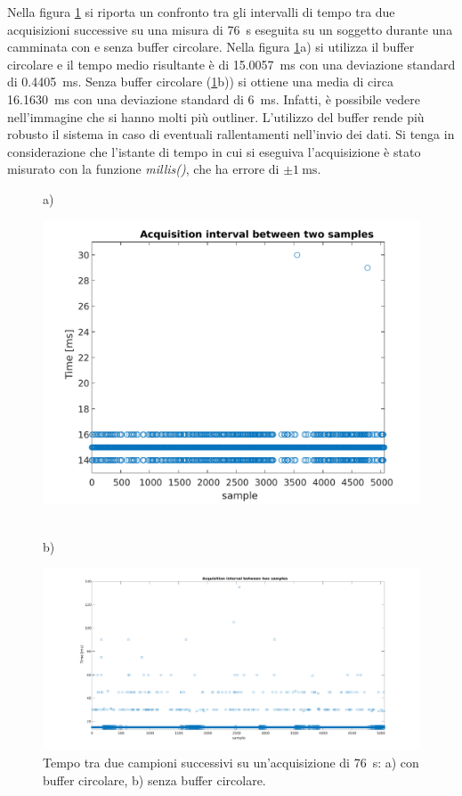 Nella figura \ref{fig:time_interval} si riporta un confronto tra gli intervalli di tempo tra due acquisizioni successive su una misura di \SI{76}{\second} eseguita su un soggetto durante una camminata con e senza buffer circolare. Nella figura \ref{fig:time_interval}a) si utilizza il buffer circolare e il tempo medio risultante è di \SI{15.0057}{\milli\second} con una deviazione standard di \SI{0.4405}{\milli\second}. Senza buffer circolare (\Fig\ref{fig:time_interval}b)) si ottiene una media di circa \SI{16.1630}{\milli\second} con una deviazione standard di \SI{6}{\milli\second}. Infatti, è possibile vedere nell'immagine che si hanno molti più outliner. L'utilizzo del buffer rende più robusto il sistema in caso di eventuali rallentamenti nell'invio dei dati. Si tenga in considerazione che l'istante di tempo in cui si eseguiva l'acquisizione è stato misurato con la funzione \textit{millis()}, che ha errore di $\pm \SI{1}{\milli\second}$. 
\begin{figure}[tbh]
	\centering
	a)
	\begin{minipage}{.900\textwidth}
		\includegraphics[width=0.8\linewidth]{./ImageFiles/interval_time.pdf}
	\end{minipage}
	\\b)
	\begin{minipage}{.900\textwidth}
		\includegraphics[width=\linewidth]{./ImageFiles/interval_time_2}
	\end{minipage}
	\caption{Tempo tra due campioni successivi su un'acquisizione di \SI{76}{\second}: a) con buffer circolare, b) senza buffer circolare.}
	\label{fig:time_interval}
\end{figure}

